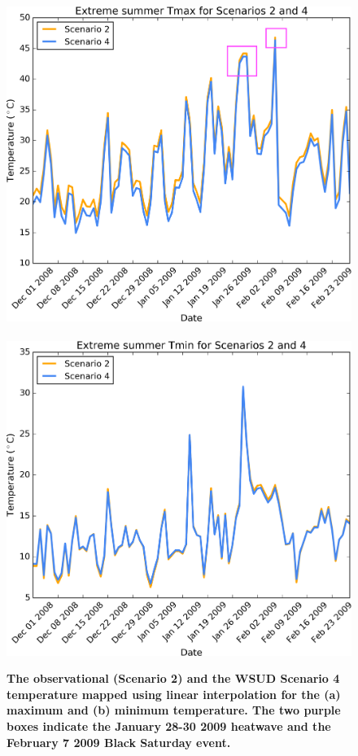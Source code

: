 \documentclass[final,3p,times,authoryear]{elsarticle}
\begin{document}
\begin{figure}[!htbp]
\centering   
\includegraphics[scale=0.40]{images/fig5a}
~
\includegraphics[scale=0.40]{images/fig5b} 
\caption{\bf The observational (Scenario 2) and the WSUD Scenario 4 temperature mapped using linear interpolation for the (a) maximum and (b) minimum temperature. The two purple boxes indicate the January 28-30 2009 heatwave and the February 7 2009 Black Saturday event.}    
 \label{fig:fig5} 
\end{figure} 
\end{document}
